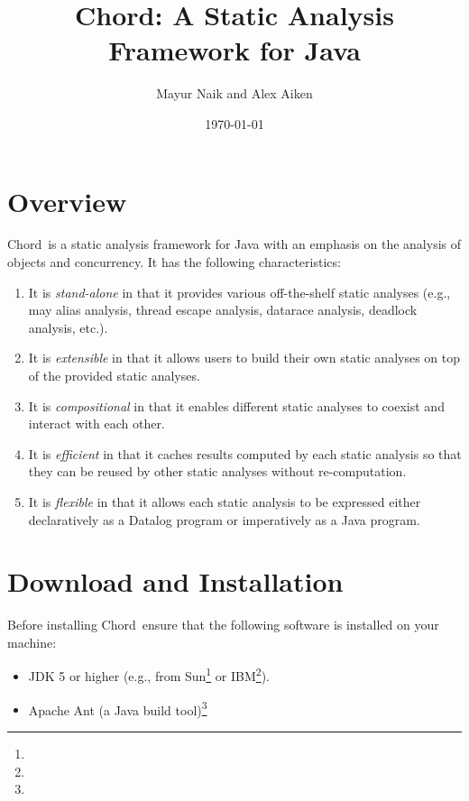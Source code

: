 \documentclass{article}
\title{Chord: A Static Analysis Framework for Java}
\author{Mayur Naik and Alex Aiken}
\date{\today}
\providecommand\Chord{{Chord}}
\begin{document}
\maketitle
\texonly{\tableofcontents}

\texonly{\newpage}
\section{Overview}

\Chord\ is a static analysis framework for Java with an emphasis on the analysis of objects and concurrency.
It has the following characteristics:
\begin{enumerate}
\item
It is {\it stand-alone} in that it provides various off-the-shelf static analyses (e.g., may alias analysis, thread escape analysis, datarace analysis, deadlock analysis, etc.).
\item
It is {\it extensible} in that it allows users to build their own static analyses on top of the provided static analyses.
\item
It is {\it compositional} in that it enables different static analyses to coexist and interact with each other.
\item
It is {\it efficient} in that it
caches results computed by each static analysis so that they can be reused by other static analyses without re-computation.
\item
It is {\it flexible} in that it allows each static analysis to be expressed either declaratively as a Datalog program or imperatively as a Java program.
\end{enumerate}

\texonly{\newpage}
\section{Download and Installation}

Before installing \Chord\ ensure that the following software is installed on your machine:

\begin{itemize}
\item
JDK 5 or higher (e.g., from
Sun\footnote{}
or IBM\footnote{}).

\item
Apache Ant (a Java build tool)\footnote{}
\end{itemize}
\end{document}
